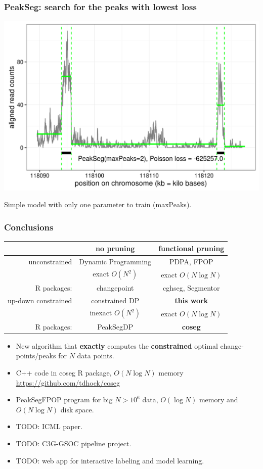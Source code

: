 \documentclass{beamer}
\begin{document}
\begin{frame}
  \frametitle{PeakSeg: search for the peaks with lowest loss}
  \includegraphics[width=1\textwidth]{figure-macs-problem-PeakSeg.png}
  
  Simple model with only one parameter to train (maxPeaks).
\end{frame}

\begin{frame}
  \frametitle{Conclusions}
  \begin{tabular}{r|c|c}
    & no pruning & functional pruning \\
    \hline
    unconstrained & Dynamic Programming & PDPA, FPOP \\
     & exact $O(N^2)$ & exact $O(N\log N)$\\
    R packages: & changepoint & cghseg, Segmentor\\
    \hline
    up-down constrained & constrained DP & \textbf{this work} \\
     & inexact $O(N^2)$ & exact $O(N\log N)$\\
    R packages: & PeakSegDP & \textbf{coseg}\\
    \hline
  \end{tabular}
  \begin{itemize}
  \item New algorithm that \textbf{exactly} computes the
    \textbf{constrained} optimal change-points/peaks for $N$ data points.
  \item C++ code in coseg R package, $O(N \log N)$ memory
    \url{https://github.com/tdhock/coseg}
  \item PeakSegFPOP program for big $N > 10^6$ data,
    $O(\log N)$ memory and $O(N\log N)$ disk space.
  \item TODO: ICML paper.
  \item TODO: C3G-GSOC pipeline project.
  \item TODO: web app for interactive labeling and model learning.
  \end{itemize}
\end{frame}
\end{document}
